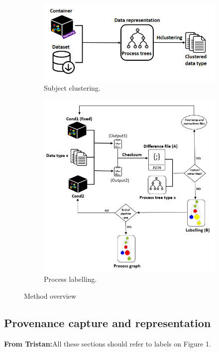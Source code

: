 \documentclass[a4paper,num-refs]{oup-contemporary}
\newcommand{\tristan}[1]{\color{blue}\textbf{From Tristan:}#1\color{black}}
\begin{document}
\begin{figure}
  \centering
  \begin{subfigure}{\columnwidth}
    \centering
    \includegraphics[width=.7\columnwidth]{images/Slide1}
    \caption{Subject clustering.}
    \label{fig:overview-cluster}
  \end{subfigure}
   \begin{subfigure}{\columnwidth}
    \centering
     \includegraphics[width=1\columnwidth]{images/Slide2}
     \caption{Process labelling.}
     \label{fig:overview-classify}
   \end{subfigure}
   \caption{Method overview}
   \label{fig:overview}
  \end{figure}

\subsection{Provenance capture and representation}
\tristan{All these sections should refer to labels on Figure 1.}
\end{document}

